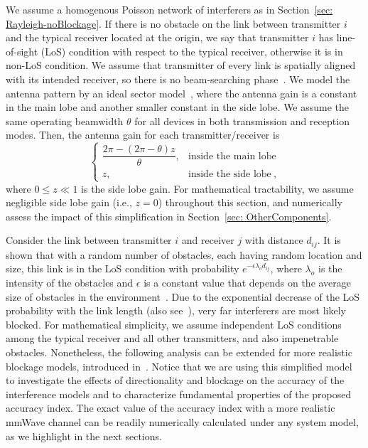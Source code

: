 \documentclass[12pt, draftclsnofoot, onecolumn]{IEEEtran}
\begin{document}
We assume a homogenous Poisson network of interferers as in Section~\ref{sec: Rayleigh-noBlockage}. If there is no obstacle on the link between transmitter $i$ and the typical receiver located at the origin, we say that transmitter $i$ has line-of-sight (LoS) condition with respect to the typical receiver, otherwise it is in non-LoS condition. We assume that transmitter of every link is spatially aligned with its intended receiver, so there is no beam-searching phase~\cite{Shokri2015Beam}.
We model the antenna pattern by an ideal sector model~\cite{di2014stochastic}, where the antenna gain is a constant in the main lobe and another smaller constant in the side lobe. We assume the same operating beamwidth $\theta$ for all devices in both transmission and reception modes. Then, the antenna gain for each transmitter/receiver is~\cite[Equation~(3)]{Shokri2015Beam}
\begin{equation}\label{eq: SectorAntennaGains}
  \begin{cases}
    \dfrac{2\pi - \left(2\pi-\theta\right)z}{\theta}, & \mbox{inside the main lobe} \\
    z, & \mbox{inside the side lobe}\:,
  \end{cases}
\end{equation}
where $0\leq z \ll 1$ is the side lobe gain. For mathematical tractability, we assume negligible side lobe gain (i.e., $z=0$) throughout this section, and numerically assess the impact of this simplification in Section~\ref{sec: OtherComponents}.

Consider the link between transmitter $i$ and receiver $j$ with distance $d_{ij}$. It is shown that with a random number of obstacles, each having random location and size, this link is in the LoS condition with probability $e^{-\epsilon \lambda_o d_{ij}}$, where $\lambda_o$ is the intensity of the obstacles and $\epsilon$ is a constant value that depends on the average size of obstacles in the environment~\cite{TBai2014Blockage}. Due to the exponential decrease of the LoS probability with the link length (also see~\cite[Fig.~4]{Rappaport2015wideband}), very far interferers are most likely blocked. For mathematical simplicity, we assume independent LoS conditions among the typical receiver and all other transmitters, and also impenetrable obstacles. Nonetheless, the following analysis can be extended for more realistic blockage models, introduced in~\cite{Shokri2015Transitional}. Notice that we are using this simplified model to investigate the effects of directionality and blockage on the accuracy of the interference models and to characterize fundamental properties of the proposed accuracy index. The exact value of the accuracy index with a more realistic mmWave channel can be readily numerically calculated under any system model, as we highlight in the next sections.
\end{document}
